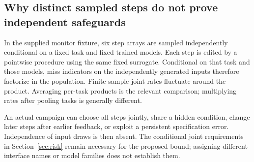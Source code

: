 \documentclass[10pt,twocolumn,letterpaper]{article}
\begin{document}
\subsection{Why distinct sampled steps do not prove independent safeguards}
In the supplied monitor fixture, six step arrays are sampled independently conditional on a fixed task and fixed trained models. Each step is edited by a pointwise procedure using the same fixed surrogate. Conditional on that task and those models, miss indicators on the independently generated inputs therefore factorize in the population. Finite-sample joint rates fluctuate around the product. Averaging per-task products is the relevant comparison; multiplying rates after pooling tasks is generally different.

An actual campaign can choose all steps jointly, share a hidden condition, change later steps after earlier feedback, or exploit a persistent specification error. Independence of input draws is then absent. The conditional joint requirements in Section~\ref{sec:risk} remain necessary for the proposed bound; assigning different interface names or model families does not establish them.
\end{document}
